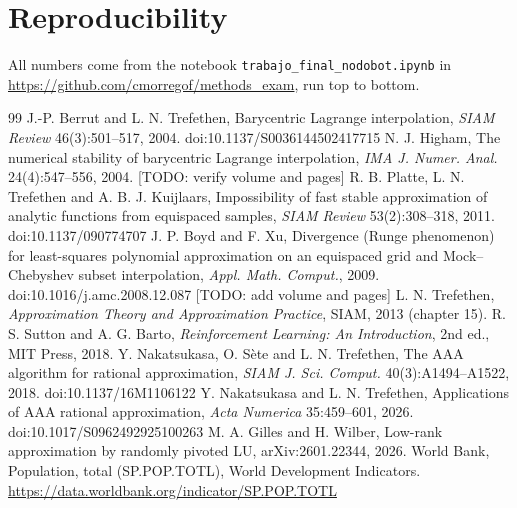 \documentclass[11pt]{article}
\newcommand{\todo}[1]{\textcolor{red!70!black}{[TODO: #1]}}
\begin{document}
\section*{Reproducibility}
All numbers come from the notebook \texttt{trabajo\_final\_nodobot.ipynb} in \url{https://github.com/cmorregof/methods_exam}, run top to bottom.

\begin{thebibliography}{99}
 J.-P. Berrut and L. N. Trefethen, Barycentric Lagrange interpolation, \emph{SIAM Review} 46(3):501--517, 2004. doi:10.1137/S0036144502417715
 N. J. Higham, The numerical stability of barycentric Lagrange interpolation, \emph{IMA J. Numer. Anal.} 24(4):547--556, 2004. \todo{verify volume and pages}
 R. B. Platte, L. N. Trefethen and A. B. J. Kuijlaars, Impossibility of fast stable approximation of analytic functions from equispaced samples, \emph{SIAM Review} 53(2):308--318, 2011. doi:10.1137/090774707
 J. P. Boyd and F. Xu, Divergence (Runge phenomenon) for least-squares polynomial approximation on an equispaced grid and Mock--Chebyshev subset interpolation, \emph{Appl. Math. Comput.}, 2009. doi:10.1016/j.amc.2008.12.087 \todo{add volume and pages}
 L. N. Trefethen, \emph{Approximation Theory and Approximation Practice}, SIAM, 2013 (chapter 15).
 R. S. Sutton and A. G. Barto, \emph{Reinforcement Learning: An Introduction}, 2nd ed., MIT Press, 2018.
 Y. Nakatsukasa, O. S\`ete and L. N. Trefethen, The AAA algorithm for rational approximation, \emph{SIAM J. Sci. Comput.} 40(3):A1494--A1522, 2018. doi:10.1137/16M1106122
 Y. Nakatsukasa and L. N. Trefethen, Applications of AAA rational approximation, \emph{Acta Numerica} 35:459--601, 2026. doi:10.1017/S0962492925100263
 M. A. Gilles and H. Wilber, Low-rank approximation by randomly pivoted LU, arXiv:2601.22344, 2026.
 World Bank, Population, total (SP.POP.TOTL), World Development Indicators. \url{https://data.worldbank.org/indicator/SP.POP.TOTL}
\end{thebibliography}
\end{document}
